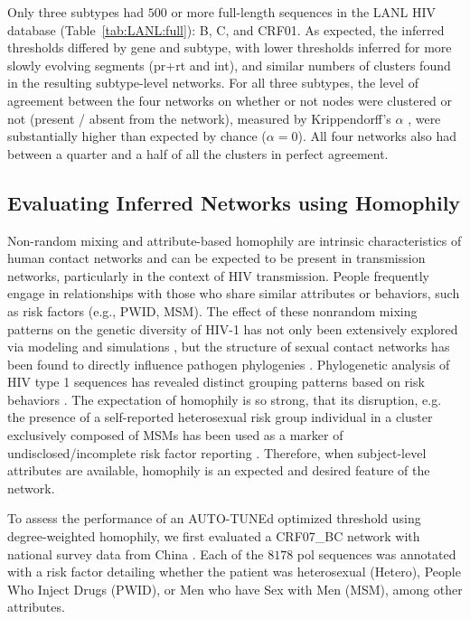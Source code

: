 \documentclass[utf8]{FrontiersinHarvard} %
\begin{document}
Only three subtypes had $500$ or more full-length sequences in the LANL HIV
database (Table~\ref{tab:LANL:full}): B, C, and CRF01. As expected, the
inferred thresholds differed by gene and subtype, with lower thresholds
inferred for more slowly evolving segments (pr+rt and int), and similar numbers
of clusters found in the resulting subtype-level networks. For all three
subtypes, the level of agreement between the four networks on whether or not
nodes were clustered or not (present / absent from the network), measured by
Krippendorff's $\alpha$ \cite{doi:10.1080/19312450709336664}, were
substantially higher than expected by chance ($\alpha = 0$). All four networks
also had between a quarter and a half of all the clusters in perfect agreement. 

\subsection{Evaluating Inferred Networks using Homophily}

Non-random mixing and attribute-based homophily are intrinsic characteristics
of human contact networks and can be expected to be present in transmission
networks, particularly in the context of HIV transmission. People frequently
engage in relationships with those who share similar attributes or behaviors,
such as risk factors (e.g., PWID, MSM). The effect of these nonrandom mixing
patterns on the genetic diversity of HIV-1 has not only been extensively
explored via modeling and simulations \citep{goodreau_assessing_2006}, but the
structure of sexual contact networks has been found to directly influence
pathogen phylogenies \citep{robinson_how_2013}. Phylogenetic analysis of HIV
type 1 sequences has revealed distinct grouping patterns based on risk
behaviors \citep{holmes_molecular_1995}. The expectation of homophily is so
strong, that its disruption, e.g. the presence of a self-reported heterosexual
risk group individual in a cluster exclusively composed of MSMs has been used
as a marker of undisclosed/incomplete risk factor reporting
\cite{Ragonnet-Cronin:2018aa}. Therefore, when subject-level attributes are
available, homophily is an expected and desired feature of the network.

To assess the performance of an AUTO-TUNEd optimized threshold using
degree-weighted homophily, we first evaluated a CRF07\_BC network with national
survey data from China \cite{Ge:2021aa} . Each of the $8178$ pol sequences was
annotated with a risk factor detailing whether the patient was heterosexual
(Hetero), People Who Inject Drugs (PWID), or Men who have Sex with Men (MSM),
among other attributes.
\end{document}
